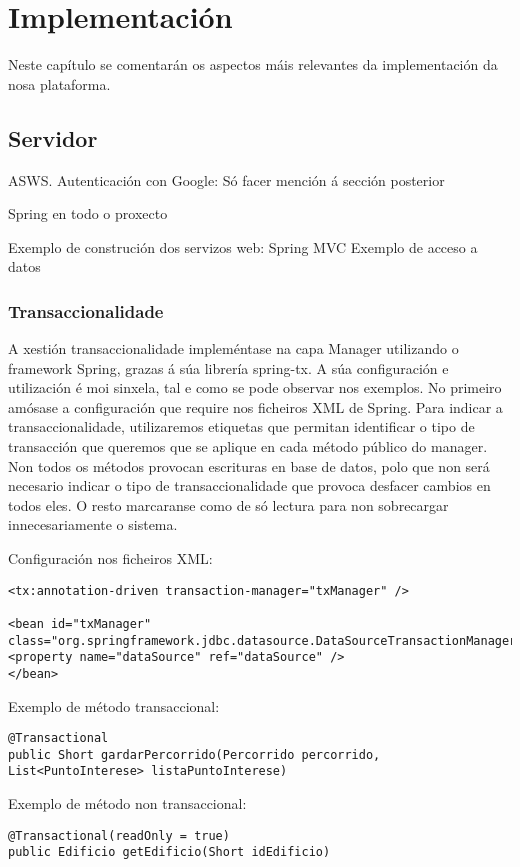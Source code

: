 \chapter{Implementación}

Neste capítulo se comentarán os aspectos máis relevantes da implementación da nosa plataforma.


\section{Servidor}

ASWS.
Autenticación con Google: Só facer mención á sección posterior

Spring en todo o proxecto

Exemplo de construción dos servizos web: Spring MVC
Exemplo de acceso a datos

\subsection{Transaccionalidade}
A xestión transaccionalidade impleméntase na capa Manager utilizando o framework Spring, grazas á súa librería spring-tx. A súa configuración e utilización é moi sinxela, tal e como se pode observar nos exemplos. No primeiro amósase a configuración que require nos ficheiros XML de Spring. Para indicar a transaccionalidade, utilizaremos etiquetas que permitan identificar o tipo de transacción que queremos que se aplique en cada método público do manager. Non todos os métodos provocan escrituras en base de datos, polo que non será necesario indicar o tipo de transaccionalidade que provoca desfacer cambios en todos eles. O resto marcaranse como de só lectura para non sobrecargar innecesariamente o sistema.

Configuración nos ficheiros XML:
\begin{lstlisting}
<tx:annotation-driven transaction-manager="txManager" />

<bean id="txManager" class="org.springframework.jdbc.datasource.DataSourceTransactionManager">
<property name="dataSource" ref="dataSource" />
</bean>
\end{lstlisting}

Exemplo de método transaccional:
\begin{lstlisting}
@Transactional
public Short gardarPercorrido(Percorrido percorrido, List<PuntoInterese> listaPuntoInterese)
\end{lstlisting}

Exemplo de método non transaccional:
\begin{lstlisting}
@Transactional(readOnly = true)
public Edificio getEdificio(Short idEdificio)
\end{lstlisting}


